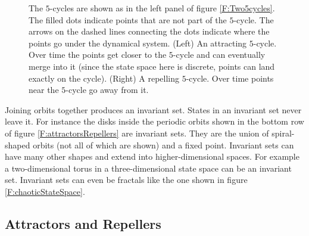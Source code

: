 \begin{figure}[h]
\centering
{}
\caption[Scott Hotton.]{The $5$-cycles are shown as in the left panel of figure
\ref{F:Two5cycles}.  The filled dots indicate points that are not part of the
$5$-cycle.  The arrows on the dashed lines connecting the dots indicate where
the points go under the dynamical system.  (Left) An attracting $5$-cycle.
Over time the points get closer to the $5$-cycle and can eventually merge into it (since the state space here is discrete, points can land exactly on the cycle). (Right) A repelling $5$-cycle.
Over time points near the $5$-cycle go away from it.}
\label{F:Attracting5cycle}
\end{figure}

   Joining orbits together produces an invariant set.  States in an invariant
set never leave it.  For instance the disks inside the periodic orbits shown in
the bottom row of figure \ref{F:attractorsRepellers} are invariant sets.  They
are the union of spiral-shaped orbits (not all of which are shown) and a fixed
point.  Invariant sets can have many other shapes and extend into higher-dimensional spaces.  For example a two-dimensional torus in a three-dimensional
state space can be an invariant set.
Invariant sets can even be fractals like the one shown in figure \ref{F:chaoticStateSpace}.



\subsection{Attractors and Repellers}

